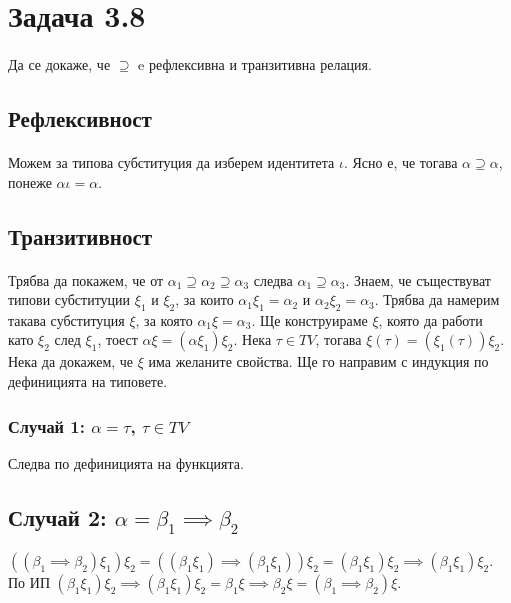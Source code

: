 \documentclass[12pt]{article}
\begin{document}
\newcommand\alphaeq{\mathrel{\stackrel{\makebox[0pt]{\mbox{\normalfont\tiny $\alpha$}}}{=}}}
\newcommand\betaeq{\mathrel{\stackrel{\makebox[0pt]{\mbox{\normalfont\tiny $\beta$}}}{=}}}
\newcommand\betaetaeq{\mathrel{\stackrel{\makebox[0pt]{\mbox{\normalfont\tiny $\beta\eta$}}}{=}}}

\section*{Задача 3.8}
\paragraph*{}
Да се докаже, че $\supseteq$ e рефлексивна и транзитивна релация.
\subsection*{Рефлексивност}
\paragraph*{}
Можем за типова субституция да изберем идентитета $\iota$. Ясно е, че тогава $\alpha \supseteq \alpha$, понеже $\alpha \iota = \alpha$.
\subsection*{Транзитивност}
\paragraph*{}
Трябва да покажем, че от $\alpha_1 \supseteq \alpha_2 \supseteq \alpha_3$ следва $\alpha_1 \supseteq \alpha_3$. Знаем, че съществуват типови субституции $\xi_1$ и $\xi_2$, за които $\alpha_1 \xi_1 = \alpha_2$ и $\alpha_2 \xi_2 = \alpha_3$. Трябва да намерим такава субституция $\xi$, за която $\alpha_1 \xi = \alpha_3$. Ще конструираме $\xi$, която да работи като $\xi_2$ след $\xi_1$, тоест $\alpha \xi = (\alpha \xi_1) \xi_2$. Нека $\tau \in TV$, тогава $\xi(\tau) = (\xi_1(\tau)) \xi_2$. Нека да докажем, че $\xi$ има желаните свойства. Ще го направим с индукция по дефиницията на типовете.
\subsubsection*{Случай 1: $\alpha = \tau$, $\tau \in TV$}
Следва по дефиницията на функцията.
\subsection*{Случай 2: $\alpha = \beta_1 \implies \beta_2$}
$((\beta_1 \implies \beta_2)\xi_1)\xi_2 = ((\beta_1 \xi_1) \implies (\beta_1 \xi_1))\xi_2 = (\beta_1 \xi_1) \xi_2 \implies (\beta_1 \xi_1) \xi_2$. По ИП $(\beta_1 \xi_1) \xi_2 \implies (\beta_1 \xi_1) \xi_2 = \beta_1 \xi \implies \beta_2 \xi = (\beta_1 \implies \beta_2)\xi$.
\end{document}
